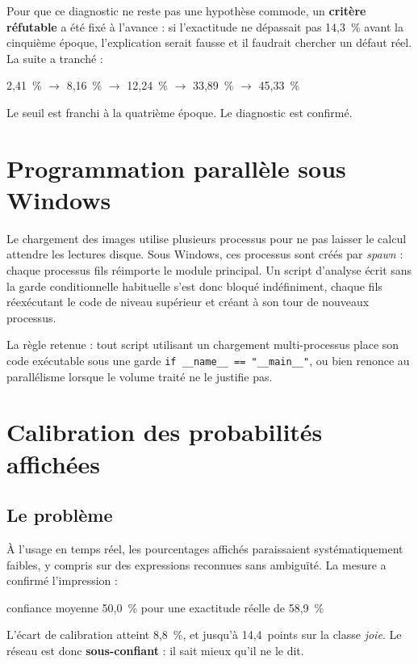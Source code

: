 \documentclass[a4paper,12pt]{report}
\begin{document}
Pour que ce diagnostic ne reste pas une hypothèse commode, un
\textbf{critère réfutable} a été fixé à l'avance : si l'exactitude ne dépassait
pas 14{,}3~\% avant la cinquième époque, l'explication serait fausse et il
faudrait chercher un défaut réel. La suite a tranché :

\begin{center}
2{,}41~\% $\rightarrow$ 8{,}16~\% $\rightarrow$ 12{,}24~\% $\rightarrow$
33{,}89~\% $\rightarrow$ 45{,}33~\%
\end{center}

Le seuil est franchi à la quatrième époque. Le diagnostic est confirmé.

\section{Programmation parallèle sous Windows}

Le chargement des images utilise plusieurs processus pour ne pas laisser le
calcul attendre les lectures disque. Sous Windows, ces processus sont créés par
\emph{spawn} : chaque processus fils réimporte le module principal. Un script
d'analyse écrit sans la garde conditionnelle habituelle s'est donc bloqué
indéfiniment, chaque fils réexécutant le code de niveau supérieur et créant à
son tour de nouveaux processus.

La règle retenue : tout script utilisant un chargement multi-processus place son
code exécutable sous une garde \texttt{if \_\_name\_\_ == "\_\_main\_\_"}, ou
bien renonce au parallélisme lorsque le volume traité ne le justifie pas.

\section{Calibration des probabilités affichées}

\subsection*{Le problème}
À l'usage en temps réel, les pourcentages affichés paraissaient
systématiquement faibles, y compris sur des expressions reconnues sans
ambiguïté. La mesure a confirmé l'impression :

\begin{center}
confiance moyenne 50{,}0~\% \quad pour une exactitude réelle de 58{,}9~\%
\end{center}

L'écart de calibration atteint 8{,}8~\%, et jusqu'à 14{,}4~points sur la classe
\emph{joie}. Le réseau est donc \textbf{sous-confiant} : il sait mieux qu'il ne
le dit.
\end{document}
